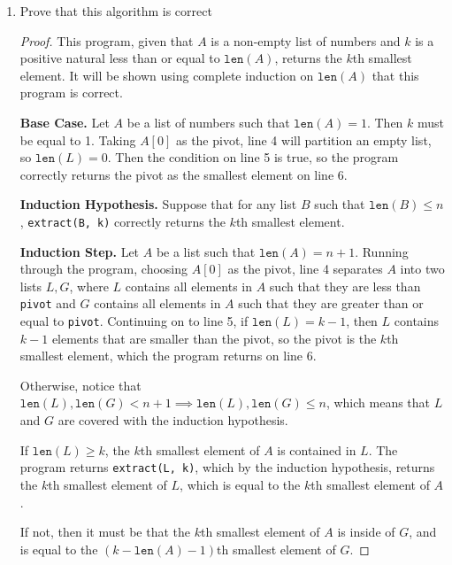 \documentclass[11pt]{article}
\begin{document}
    \begin{enumerate}[label=(\alph*)]
        \item Prove that this algorithm is correct
        
        \begin{proof}
            This program, given that \(A\) is a non-empty list of numbers and \(k\) is a positive natural less than or equal to \(\texttt{len}(A)\), returns the \(k\)th smallest element. It will be shown using complete induction on \(\texttt{len}(A)\) that this program is correct.

            \textbf{Base Case.} Let \(A\) be a list of numbers such that \(\texttt{len}(A) = 1\). Then \(k\) must be equal to 1. Taking \(A[0]\) as the pivot, line 4 will partition an empty list, so \(\texttt{len}(L) = 0\). Then the condition on line 5 is true, so the program correctly returns the pivot as the smallest element on line 6.

            \textbf{Induction Hypothesis.} Suppose that for any list \(B\) such that \(\texttt{len}(B) \leq n\), \verb|extract(B, k)| correctly returns the \(k\)th smallest element.

            \textbf{Induction Step.} Let \(A\) be a list such that \(\texttt{len}(A) = n + 1\). Running through the program, choosing \(A[0]\) as the pivot, line 4 separates \(A\) into two lists \(L,G\), where \(L\) contains all elements in \(A\) such that they are less than \texttt{pivot} and \(G\) contains all elements in \(A\) such that they are greater than or equal to \texttt{pivot}. Continuing on to line 5, if \(\texttt{len}(L) = k - 1\), then \(L\) contains \(k-1\) elements that are smaller than the pivot, so the pivot is the \(k\)th smallest element, which the program returns on line 6.

            Otherwise, notice that \(\texttt{len}(L),\texttt{len}(G) < n+1 \implies \texttt{len}(L),\texttt{len}(G) \leq n\), which means that \(L\) and \(G\) are covered with the induction hypothesis.
            
            If \(\texttt{len}(L) \geq k\), the \(k\)th smallest element of \(A\) is contained in \(L\). The program returns \verb|extract(L, k)|, which by the induction hypothesis, returns the \(k\)th smallest element of \(L\), which is equal to the \(k\)th smallest element of \(A\).

            If not, then it must be that the \(k\)th smallest element of \(A\) is inside of \(G\), and is equal to the \((k - \texttt{len}(A) - 1)\)th smallest element of \(G\).
            

\end{proof}
\end{enumerate}
\end{document}
